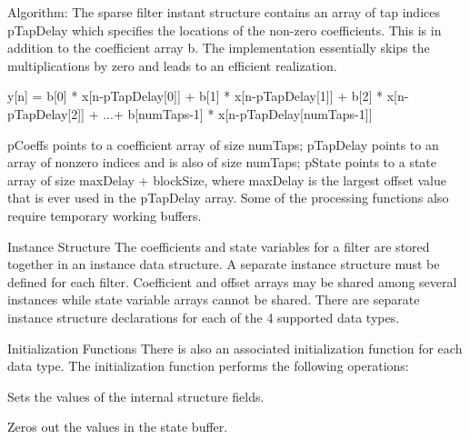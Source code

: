 \begin{DoxyParagraph}{Algorithm\-: }
The sparse filter instant structure contains an array of tap indices {\ttfamily p\-Tap\-Delay} which specifies the locations of the non-\/zero coefficients. This is in addition to the coefficient array {\ttfamily b}. The implementation essentially skips the multiplications by zero and leads to an efficient realization. 
\begin{DoxyPre}  
     y[n] = b[0] * x[n-pTapDelay[0]] + b[1] * x[n-pTapDelay[1]] + b[2] * x[n-pTapDelay[2]] + ...+ b[numTaps-1] * x[n-pTapDelay[numTaps-1]]   
 \end{DoxyPre}
 
\end{DoxyParagraph}
\begin{DoxyParagraph}{}
 
\end{DoxyParagraph}
\begin{DoxyParagraph}{}
{\ttfamily p\-Coeffs} points to a coefficient array of size {\ttfamily num\-Taps}; {\ttfamily p\-Tap\-Delay} points to an array of nonzero indices and is also of size {\ttfamily num\-Taps}; {\ttfamily p\-State} points to a state array of size {\ttfamily max\-Delay + block\-Size}, where {\ttfamily max\-Delay} is the largest offset value that is ever used in the {\ttfamily p\-Tap\-Delay} array. Some of the processing functions also require temporary working buffers.
\end{DoxyParagraph}
\begin{DoxyParagraph}{Instance Structure }
The coefficients and state variables for a filter are stored together in an instance data structure. A separate instance structure must be defined for each filter. Coefficient and offset arrays may be shared among several instances while state variable arrays cannot be shared. There are separate instance structure declarations for each of the 4 supported data types.
\end{DoxyParagraph}
\begin{DoxyParagraph}{Initialization Functions }
There is also an associated initialization function for each data type. The initialization function performs the following operations\-:
\begin{DoxyItemize}
\item Sets the values of the internal structure fields.
\item Zeros out the values in the state buffer.
\end{DoxyItemize}
\end{DoxyParagraph}

